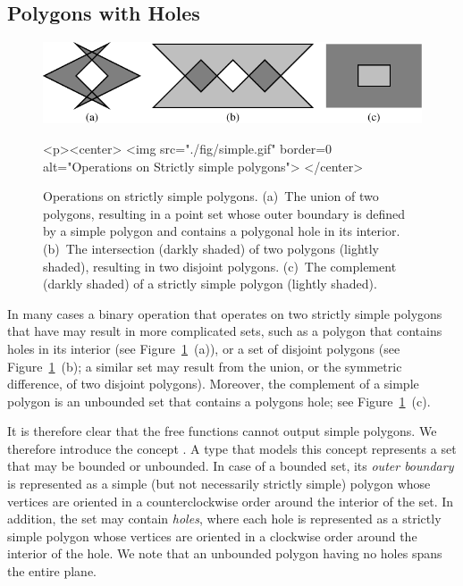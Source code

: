 \lcTex{\vspace{-20pt}}

\subsection{Polygons with Holes}
\label{bops_ssec:polygons_with_holes}

\begin{figure}[!htp]
\begin{ccTexOnly}
  \begin{center}
  \includegraphics{Boolean_set_operations_2/fig/simple}
  \end{center}
\end{ccTexOnly}
\label{fig:simple}
\begin{ccHtmlOnly}
  <p><center>
    <img src="./fig/simple.gif" border=0 alt="Operations on Strictly
    simple polygons">
  </center>
\end{ccHtmlOnly}
\caption{Operations on strictly simple polygons. (a)~The union of two
polygons, resulting in a point set whose outer boundary is defined by
a simple polygon and contains a polygonal hole in its interior. (b)~The
intersection (darkly shaded) of two polygons (lightly shaded), resulting
in two disjoint polygons. (c)~The complement (darkly shaded) of a strictly
simple polygon (lightly shaded).} 
\end{figure}

In many cases a binary operation that operates on two strictly simple
polygons that have may result in more complicated sets, such as a polygon
that contains holes in its interior (see Figure~\ref{fig:simple}~(a)), 
or a set of disjoint polygons (see Figure~\ref{fig:simple}~(b); a similar
set may result from the union, or the symmetric difference, of two disjoint
polygons). Moreover, the complement of a simple polygon is an unbounded set
that contains a polygons hole; see Figure~\ref{fig:simple}~(c).

It is therefore clear that the free functions cannot output simple polygons.
We therefore introduce the concept . A type
that models this concept represents a set that may be bounded or unbounded.
In case of a bounded set, its {\em outer boundary} is represented as a simple
(but not necessarily strictly simple) polygon whose vertices are oriented in
a counterclockwise order around the interior of the set. In addition, the
set may contain {\em holes}, where each hole is represented as a strictly simple
polygon whose vertices are oriented in a clockwise order around the interior
of the hole. We note that an unbounded polygon having no holes spans the
entire plane. 

